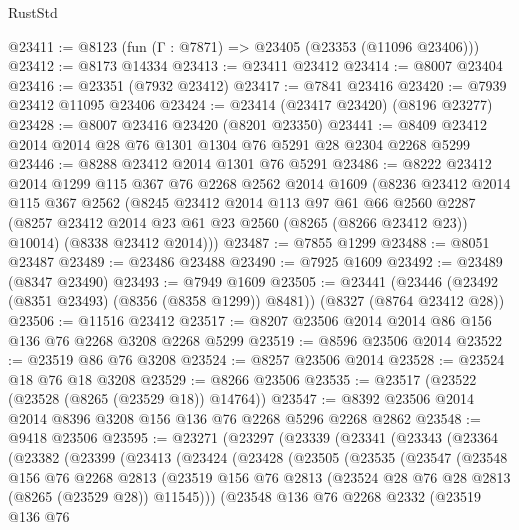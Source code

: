 \begin{lexlean}{RustStd}
\begin{coremodule}
{\begin{coremodule}
{{{{{{{{{{{{{{{{{{{{{{{{{{{{{{{{{{{{{{{{{{{{{{{{{{{{{{@23411 := @8123 (fun (Γ : @7871) => @23405 (@23353 (@11096 @23406)))
@23412 := @8173 @14334
@23413 := @23411 @23412
@23414 := @8007 @23404
@23416 := @23351 (@7932 @23412)
@23417 := @7841 @23416
@23420 := @7939 @23412 @11095 @23406
@23424 := @23414 (@23417 @23420) (@8196 @23277)
@23428 := @8007 @23416 @23420 (@8201 @23350)
@23441 := @8409 @23412 @2014 @2014 @28 @76 @1301 @1304 @76 @5291 @28 @2304 @2268 @5299
@23446 := @8288 @23412 @2014 @1301 @76 @5291
@23486 := @8222
    @23412
    @2014
    @1299
    @115
    @367
    @76
    @2268
    @2562
    @2014
    @1609
    (@8236
      @23412
      @2014
      @115
      @367
      @2562
      (@8245
        @23412
        @2014
        @113
        @97
        @61
        @66
        @2560
        @2287
        (@8257 @23412 @2014 @23 @61 @23 @2560 (@8265 (@8266 @23412 @23)) @10014)
        (@8338 @23412 @2014)))
@23487 := @7855 @1299
@23488 := @8051 @23487
@23489 := @23486 @23488
@23490 := @7925 @1609
@23492 := @23489 (@8347 @23490)
@23493 := @7949 @1609
@23505 := @23441
    (@23446 (@23492 (@8351 @23493) (@8356 (@8358 @1299)) @8481))
    (@8327 (@8764 @23412 @28))
@23506 := @11516 @23412
@23517 := @8207 @23506 @2014 @2014 @86 @156 @136 @76 @2268 @3208 @2268 @5299
@23519 := @8596 @23506 @2014
@23522 := @23519 @86 @76 @3208
@23524 := @8257 @23506 @2014
@23528 := @23524 @18 @76 @18 @3208
@23529 := @8266 @23506
@23535 := @23517 (@23522 (@23528 (@8265 (@23529 @18)) @14764))
@23547 := @8392 @23506 @2014 @2014 @8396 @3208 @156 @136 @76 @2268 @5296 @2268 @2862
@23548 := @9418 @23506
@23595 := @23271
    (@23297
      (@23339
        (@23341
          (@23343
            (@23364
              (@23382
                (@23399
                  (@23413
                    (@23424
                      (@23428
                        (@23505
                          (@23535
                            (@23547
                              (@23548
                                @156
                                @76
                                @2268
                                @2813
                                (@23519
                                  @156
                                  @76
                                  @2813
                                  (@23524 @28 @76 @28 @2813 (@8265 (@23529 @28)) @11545)))
                              (@23548
                                @136
                                @76
                                @2268
                                @2332
                                (@23519
                                  @136
                                  @76
}}}}}}}}}}}}}}}}}}}}}}}}}}}}}}}}}}}}}}}}}}}}}}}}}}}}}}
\end{coremodule}}
\end{coremodule}
\end{lexlean}

